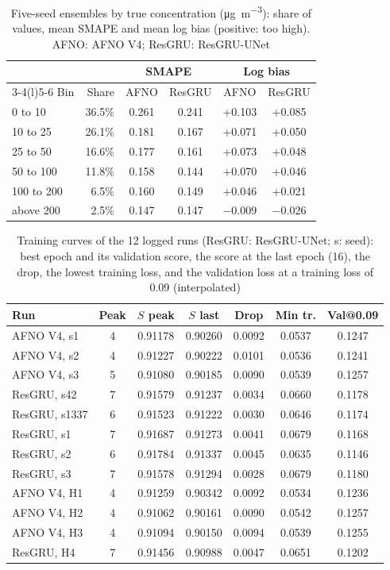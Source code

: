 \documentclass[journal]{IEEEtran}
\newcommand{\ugm}{\si{\micro\gram\per\cubic\metre}}
\begin{document}
\begin{table}[H]
\centering
\caption{Five-seed ensembles by true concentration (\ugm): share of values, mean SMAPE and mean log bias (positive: too high). AFNO: AFNO V4; ResGRU: ResGRU-UNet}
\label{tab:bins}
\setlength{\tabcolsep}{3pt}
\begin{tabular}{@{}lrcccc@{}}
\toprule
 & & \multicolumn{2}{c}{SMAPE} & \multicolumn{2}{c}{Log bias} \\
\cmidrule(lr){3-4}\cmidrule(l){5-6}
Bin & Share & AFNO & ResGRU & AFNO & ResGRU \\
\midrule
0 to 10 & 36.5\% & 0.261 & 0.241 & +0.103 & +0.085 \\
10 to 25 & 26.1\% & 0.181 & 0.167 & +0.071 & +0.050 \\
25 to 50 & 16.6\% & 0.177 & 0.161 & +0.073 & +0.048 \\
50 to 100 & 11.8\% & 0.158 & 0.144 & +0.070 & +0.046 \\
100 to 200 & 6.5\% & 0.160 & 0.149 & +0.046 & +0.021 \\
above 200 & 2.5\% & 0.147 & 0.147 & $-$0.009 & $-$0.026 \\
\bottomrule
\end{tabular}
\end{table}

\begin{table}[H]
\centering
\caption{Training curves of the 12 logged runs (ResGRU: ResGRU-UNet; s: seed): best epoch and its validation score, the score at the last epoch (16), the drop, the lowest training loss, and the validation loss at a training loss of 0.09 (interpolated)}
\label{tab:curves}
\setlength{\tabcolsep}{2.4pt}
\begin{tabular}{@{}lcccccc@{}}
\toprule
Run & Peak & $S$ peak & $S$ last & Drop & Min tr. & Val@0.09 \\
\midrule
AFNO V4, s1 & 4 & 0.91178 & 0.90260 & 0.0092 & 0.0537 & 0.1247 \\
AFNO V4, s2 & 4 & 0.91227 & 0.90222 & 0.0101 & 0.0536 & 0.1241 \\
AFNO V4, s3 & 5 & 0.91080 & 0.90185 & 0.0090 & 0.0539 & 0.1257 \\
ResGRU, s42 & 7 & 0.91579 & 0.91237 & 0.0034 & 0.0660 & 0.1178 \\
ResGRU, s1337 & 6 & 0.91523 & 0.91222 & 0.0030 & 0.0646 & 0.1174 \\
ResGRU, s1 & 7 & 0.91687 & 0.91273 & 0.0041 & 0.0679 & 0.1168 \\
ResGRU, s2 & 6 & 0.91784 & 0.91337 & 0.0045 & 0.0635 & 0.1146 \\
ResGRU, s3 & 7 & 0.91578 & 0.91294 & 0.0028 & 0.0679 & 0.1180 \\
AFNO V4, H1 & 4 & 0.91259 & 0.90342 & 0.0092 & 0.0534 & 0.1236 \\
AFNO V4, H2 & 4 & 0.91062 & 0.90161 & 0.0090 & 0.0542 & 0.1257 \\
AFNO V4, H3 & 4 & 0.91094 & 0.90150 & 0.0094 & 0.0539 & 0.1255 \\
ResGRU, H4 & 7 & 0.91456 & 0.90988 & 0.0047 & 0.0651 & 0.1202 \\
\bottomrule
\end{tabular}
\end{table}
\end{document}
